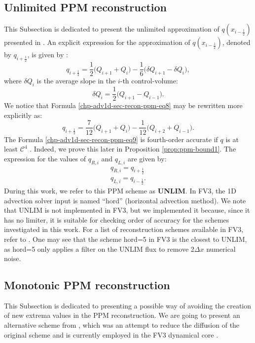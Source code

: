 \subsection{Unlimited PPM reconstruction}
\label{chp-adv1d-sec-hord0}
This Subsection is dedicated to present the unlimited approximation of $q(x_{i-\frac{1}{2}})$ presented in \citet{colella:1984}.
An explicit expression for the approximation of $q(x_{i-\frac{1}{2}})$, denoted by $q_{i+\frac{1}{2}}$, is given by \citep{colella:1984}:
\begin{equation}
	\label{chp-adv1d-sec-recon-ppm-eq7}
	q_{i+\frac{1}{2}} = \frac{1}{2} \bigg( Q_{i+1} + Q_{i} \bigg) - \frac{1}{6} \bigg( \delta Q_{i+1} - \delta Q_{i}\bigg),
\end{equation}
where $\delta Q_{i}$ is the average slope in the $i$-th control-volume:
\begin{equation}
	\label{chp-adv1d-sec-recon-ppm-eq8}
	\delta Q_{i} = \frac{1}{2} \bigg( Q_{i+1} - Q_{i-1} \bigg).
\end{equation}
We notice that Formula \eqref{chp-adv1d-sec-recon-ppm-eq8} may be rewritten more explicitly as:
\begin{equation}
	\label{chp-adv1d-sec-recon-ppm-eq9}
	q_{i+\frac{1}{2}} = \frac{7}{12} \bigg( Q_{i+1} + Q_{i} \bigg) - \frac{1}{12} \bigg(  Q_{i+2} +Q_{i-1}\bigg).
\end{equation}
The Formula \eqref{chp-adv1d-sec-recon-ppm-eq9} is fourth-order accurate if
$q$ is at least $\mathcal{C}^4$ \citep{colella:1984}. Indeed, we
prove this later in Proposition \ref{prop:ppm-bound1}.
The expression for the values of $q_{R,i}$ and $q_{L,i}$ are given by:
\begin{align}
	\label{chp-adv1d-sec-recon-ppm-eq10}
	q_{R,i} = q_{i+\frac{1}{2}} \\
	\label{chp-adv1d-sec-recon-ppm-eq11}
	q_{L,i} = q_{i-\frac{1}{2}}.
\end{align}
During this work, we refer to this PPM scheme as \textbf{UNLIM}.
In FV3, the 1D advection solver input is named ``hord'' (horizontal advection method).
We note that UNLIM is not implemented in FV3, but we implemented it because, since it has no limiter, it is suitable for checking order of accuracy for the schemes investigated in this work.
For a list of reconstruction schemes available in FV3, refer to \citet{harris:2021}. One may see that the scheme hord=5 in FV3 is the closest to UNLIM, as hord=5 only applies a filter on the UNLIM flux to remove  2$\Delta x$ numerical noise.

\subsection{Monotonic PPM reconstruction}
\label{chp-adv1d-sec-hord8}
This Subsection is dedicated to presenting a possible way of avoiding the creation of new 
extrema values in the PPM reconstruction. We are going to present an alternative scheme from \citet{lin:2004},
which was an attempt to reduce the diffusion of the original scheme \citet{colella:1984}
and is currently employed in the FV3 dynamical core \citep{harris:2021}.

